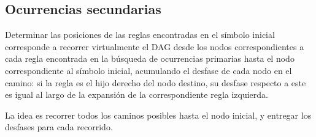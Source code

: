 \subsection{Ocurrencias secundarias }
\label{sect:second}
Determinar las posiciones de las reglas encontradas en el símbolo inicial corresponde a recorrer virtualmente el DAG desde los nodos correspondientes a cada regla encontrada en la búsqueda de ocurrencias primarias hasta el nodo correspondiente al símbolo inicial, acumulando el desfase de cada nodo en el camino: si la regla es el hijo derecho del nodo destino, su desfase respecto a este es igual al largo de la expansión de la correspondiente regla izquierda. 

La idea es recorrer todos los caminos posibles hasta el nodo inicial, y entregar los desfases para cada recorrido. 

